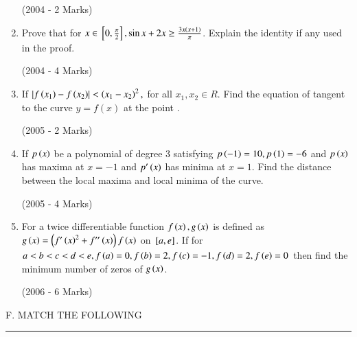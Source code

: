 \documentclass[journal]{IEEEtran}
\begin{document}
\begin{enumerate}
\hfill{(2004 - 2 Marks)}\\

\item Prove that for $x\in{}\left[0,\frac{\pi}{2}\right], \sin x+2x\geq \frac{3x\left(x+1\right)}{\pi}$. Explain the identity if any used in the proof.

\hfill{(2004 - 4 Marks)}\\

\item If $\left\vert f\left(x_{1}\right)-f\left(x_{2}\right)\right\vert<\left(x_{1}-x_{2}\right)^{2},$ for all $x_{1},x_{2} \in R$. Find the equation of tangent to the curve $y=f(x)$ at the point .

\hfill{(2005 - 2 Marks)}\\

\item If $p\left(x\right)$ be a polynomial of degree 3 satisfying $p\left(-1\right)=10, p\left(1\right)=-6$ and $p\left(x\right)$ has maxima at $x=-1$ and $p^{\prime}\left(x\right)$ has minima at $x=1$. Find the distance between the local maxima and local minima of the curve.

\hfill{(2005 - 4 Marks)}\\

\item For a twice differentiable function $f\left(x\right), g\left(x\right)$ is defined as $g\left(x\right)=\left(f^{\prime}\left(x\right)^{2}+f^{\prime\prime}\left(x\right)\right) f\left(x\right)$ on ${}\left[a,e\right]$. If for $a<b<c<d<e, f\left(a\right)=0,f\left(b\right)=2,f\left(c\right)=-1,f\left(d\right)=2,f\left(e\right)=0$ then find the minimum number of zeros of $g\left(x\right)$.

\hfill{(2006 - 6 Marks)}\\  
\end{enumerate}
F. MATCH THE FOLLOWING \\

\hrule \
\end{document}
